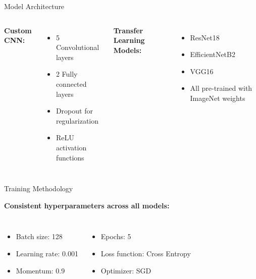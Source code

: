 \documentclass{beamer}
\begin{document}
\begin{frame}{Model Architecture}
    \begin{columns}[T]
        \textbf{\textcolor{maincolor}{Custom CNN:}}
        \begin{itemize}
            \item 5 Convolutional layers
            \item 2 Fully connected layers
            \item Dropout for regularization
            \item ReLU activation functions
        \end{itemize}
        
        \textbf{\textcolor{maincolor}{Transfer Learning Models:}}
        \begin{itemize}
            \item ResNet18
            \item EfficientNetB2
            \item VGG16
            \item All pre-trained with ImageNet weights
        \end{itemize}
    \end{columns}
\end{frame}

\begin{frame}{Training Methodology}
    \begin{center}
        \textbf{\textcolor{maincolor}{Consistent hyperparameters across all models:}}
    \end{center}
    \vspace{0.5cm}
    \begin{columns}[T]
        \begin{itemize}
            \item Batch size: 128
            \item Learning rate: 0.001
            \item Momentum: 0.9
        \end{itemize}
        
        \begin{itemize}
            \item Epochs: 5
            \item Loss function: Cross Entropy
            \item Optimizer: SGD
        \end{itemize}
    \end{columns}
\end{frame}
\end{document}
